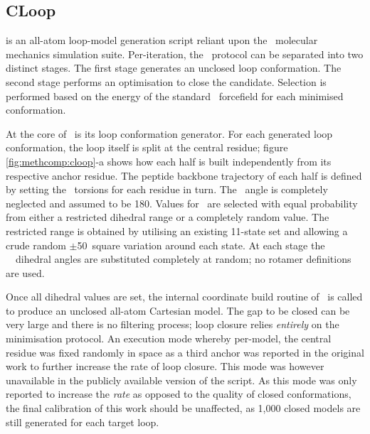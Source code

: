 \subsection{CLoop}


\cloop\cite{METHOD:CLOOP} is an all-atom loop-model generation script reliant upon the \charmm\ molecular mechanics simulation suite\cite{COMPCHEM:MacKerell1998,FORCEFIELD:CHARMM}. Per-iteration, the \cloop\ protocol can be separated into two distinct stages. The first stage generates an unclosed loop conformation. The second stage performs an optimisation to close the candidate. Selection is performed based on the energy of the standard \ forcefield  for each minimised conformation.

At the core of \cloop\ is its loop conformation generator. For each generated loop conformation, the loop itself is split at the central residue; figure
\ref{fig:methcomp:cloop}-a shows how each half is built independently from its respective anchor residue. The peptide backbone trajectory of each half is defined by setting the \phipsi\ torsions for each residue in turn. The \Omg\ angle is completely neglected and assumed to be 180\degree. Values for \phipsi\ are selected with equal probability from either a restricted dihedral range or a completely random value. The restricted range is obtained by utilising an existing 11-state set\cite{METHOD:Moult86} and allowing a crude random $\pm$50\degree\ square variation around each state. At each stage the \Chi\ \sidechain\ dihedral angles are substituted completely at random; no rotamer definitions are used. 

Once all dihedral values are set, the internal coordinate build routine of \charmm\ is called to produce an unclosed all-atom Cartesian model. The gap to be closed can be very large and there is no filtering process; loop closure relies \emph{entirely} on the minimisation protocol. An execution mode whereby per-model, the central residue was fixed randomly in space as a third anchor was reported in the original work to further increase the rate of loop closure. This mode was however unavailable in the publicly available version of the script. As this mode was
only reported to increase the \emph{rate} as opposed to the quality of closed conformations, the final calibration of this work should be unaffected, as 1,000 closed models are still generated for each target loop.

